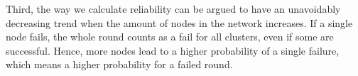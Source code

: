 Third, the way we calculate reliability can be argued to have an unavoidably decreasing trend when the amount of nodes in the network increases. If a single node fails, the whole round counts as a fail for all clusters, even if some are successful. Hence, more nodes lead to a higher probability of a single failure, which means a higher probability for a failed round.
\newpage





